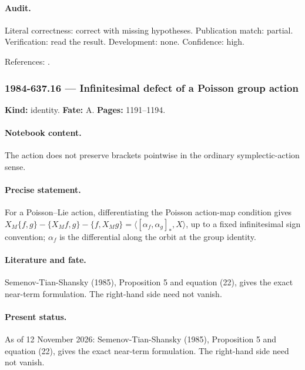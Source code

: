 \paragraph{Audit.} Literal correctness: correct with missing hypotheses. Publication match: partial. Verification: read the result. Development: none. Confidence: high.

\noindent References: \citep{drinfeld1983hamiltonian,semenov1985dressing}.\par

\subsubsection{1984-637.16 --- Infinitesimal defect of a Poisson group action}

\label{item:1984-637.16}

\noindent\textbf{Kind:} identity. \textbf{Fate:} A. \textbf{Pages:} 1191--1194.\par

\paragraph{Notebook content.} The action does not preserve brackets pointwise in the ordinary symplectic-action sense.

\paragraph{Precise statement.} For a Poisson--Lie action, differentiating the Poisson action-map condition gives \(X_M\{f,g\}-\{X_Mf,g\}-\{f,X_Mg\}=\langle[\alpha_f,\alpha_g]_*,X\rangle\), up to a fixed infinitesimal sign convention; \(\alpha_f\) is the differential along the orbit at the group identity.

\paragraph{Literature and fate.} Semenov-Tian-Shansky (1985), Proposition 5 and equation (22), gives the exact near-term formulation. The right-hand side need not vanish.

\paragraph{Present status.} As of 12 November 2026: Semenov-Tian-Shansky (1985), Proposition 5 and equation (22), gives the exact near-term formulation. The right-hand side need not vanish.

